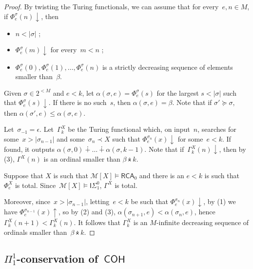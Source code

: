 \documentclass{article}
\numberwithin{theorem}{section}
\newcommand{\RCA}{\mathsf{RCA}}
\newcommand{\COH}{\mathsf{COH}}
\newcommand{\ISig}{\mathsf{I}\Sigma^0}
\newcommand{\M}{\mathcal{M}}
\newcommand{\nplus}{\dotplus}
\newcommand{\ntimes}{\dottimes}
\begin{document}
\begin{proof}
By twisting the Turing functionals, we can assume that for every~$e, n \in M$, if $\Phi^\sigma_e(n)\downarrow$, then
\begin{itemize}
    \item[(1)] $n < |\sigma|$ ;
    \item[(2)] $\Phi^\sigma_e(m)\downarrow$ for every~$m < n$ ;
    \item[(3)] $\Phi^\sigma_e(0), \Phi^\sigma_e(1), \dots, \Phi^\sigma_e(n)$ is a strictly decreasing sequence of elements smaller than~$\beta$.
\end{itemize}

Given $\sigma \in 2^{<M}$ and $e < k$, let $\alpha(\sigma, e) = \Phi^{\sigma}_e(s)$ for the largest $s < |\sigma|$ such that $\Phi^{\sigma}_e(s)\downarrow$. If there is no such~$s$, then $\alpha(\sigma, e) = \beta$. Note that if $\sigma' \succeq \sigma$, then $\alpha(\sigma',e) \leq \alpha(\sigma,e)$.

Let~$\sigma_{-1} = \epsilon$.
Let~$\Gamma^X_k$ be the Turing functional which, on input~$n$, searches for some~$x > |\sigma_{n-1}|$ and some~$\sigma_n \prec X$ such that $\Phi_e^{\sigma_n}(x)\downarrow$ for some~$e < k$. If found, it outputs $\alpha(\sigma, 0) \nplus \dots \nplus \alpha(\sigma, k-1)$. Note that if~$\Gamma^X_k(n)\downarrow$, then by (3), $\Gamma^X(n)$ is an ordinal smaller than $\beta \ntimes k$.

Suppose that $X$ is such that $\M[X] \models \RCA_0$ and there is an $e < k$ is such that $\Phi_e^X$ is total.
Since~$\M[X] \models \ISig_1$, $\Gamma^X$ is total.

Moreover, since~$x > |\sigma_{n-1}|$, letting~$e < k$ be such that $\Phi_e^{\sigma_n}(x)\downarrow$, by (1) we have $\Phi_e^{\sigma_{n-1}}(x)\uparrow$, so by (2) and (3), $\alpha(\sigma_{n+1},e) < \alpha(\sigma_n, e)$, hence $\Gamma^X_k(n+1) < \Gamma^X_k(n)$. It follows that $\Gamma^X_k$ is an $M$-infinite decreasing sequence of ordinals smaller than~$\beta \ntimes k$.
\end{proof}

\subsection{$\Pi^1_1$-conservation of~$\COH$}
\end{document}
